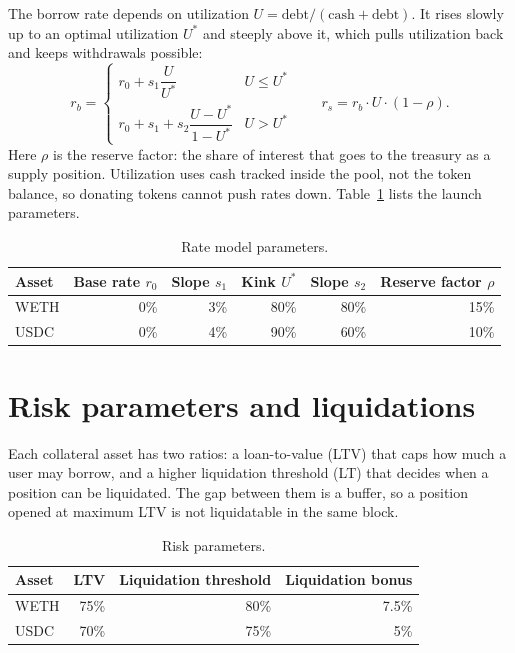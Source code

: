 \documentclass[11pt,a4paper]{article}
\begin{document}
The borrow rate depends on utilization $U = \text{debt} / (\text{cash} + \text{debt})$. It rises slowly up to
an optimal utilization $U^*$ and steeply above it, which pulls utilization back and keeps withdrawals possible:
\begin{equation}
  r_b =
  \begin{cases}
    r_0 + s_1 \dfrac{U}{U^*} & U \le U^* \\[8pt]
    r_0 + s_1 + s_2 \dfrac{U - U^*}{1 - U^*} & U > U^*
  \end{cases}
  \qquad
  r_s = r_b \cdot U \cdot (1 - \rho) .
\end{equation}
Here $\rho$ is the reserve factor: the share of interest that goes to the treasury as a supply position.
Utilization uses cash tracked inside the pool, not the token balance, so donating tokens cannot push rates
down. Table~\ref{tab:rates} lists the launch parameters.

\begin{table}[h]
\centering
\caption{Rate model parameters.}
\label{tab:rates}
\begin{tabular}{lrrrrr}
\toprule
Asset & Base rate $r_0$ & Slope $s_1$ & Kink $U^*$ & Slope $s_2$ & Reserve factor $\rho$ \\
\midrule
WETH & 0\% & 3\% & 80\% & 80\% & 15\% \\
USDC & 0\% & 4\% & 90\% & 60\% & 10\% \\
\bottomrule
\end{tabular}
\end{table}

\section{Risk parameters and liquidations}

Each collateral asset has two ratios: a loan-to-value (LTV) that caps how much a user may borrow, and a higher
liquidation threshold (LT) that decides when a position can be liquidated. The gap between them is a buffer, so
a position opened at maximum LTV is not liquidatable in the same block.

\begin{table}[h]
\centering
\caption{Risk parameters.}
\label{tab:risk}
\begin{tabular}{lrrr}
\toprule
Asset & LTV & Liquidation threshold & Liquidation bonus \\
\midrule
WETH & 75\% & 80\% & 7.5\% \\
USDC & 70\% & 75\% & 5\% \\
\bottomrule
\end{tabular}
\end{table}
\end{document}
